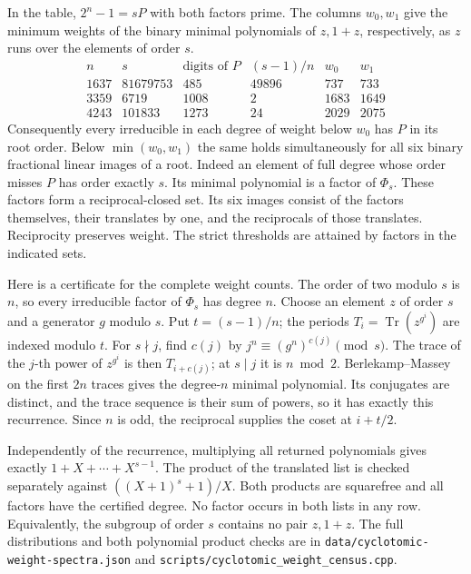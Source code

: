 \documentclass[11pt]{article}
\begin{document}
In the table, \(2^n-1=sP\) with both factors prime. The columns
\(w_0,w_1\) give the minimum weights of the binary minimal polynomials of
\(z,1+z\), respectively, as \(z\) runs over the elements of order \(s\).
\[
\begin{array}{r|r|r|r|r|r}
 n&s&\text{digits of }P&(s-1)/n&w_0&w_1\\\hline
 1637&81679753&485&49896&737&733\\
 3359&6719&1008&2&1683&1649\\
 4243&101833&1273&24&2029&2075
\end{array}
\]
Consequently every irreducible in each degree of weight below \(w_0\)
has \(P\) in its root order. Below \(\min(w_0,w_1)\) the same holds
simultaneously for all six binary fractional linear images of a root.
Indeed an element of full degree whose order misses \(P\) has order
exactly \(s\). Its minimal polynomial is a factor of \(\Phi_s\).
These factors form a reciprocal-closed set. Its six images consist of
the factors themselves, their translates by one, and the reciprocals
of those translates. Reciprocity preserves weight. The strict
thresholds are attained by factors in the indicated sets.

Here is a certificate for the complete weight counts. The order of two
modulo \(s\) is \(n\), so every irreducible factor of \(\Phi_s\) has
degree \(n\). Choose an element \(z\) of order \(s\) and a generator
\(g\) modulo \(s\). Put \(t=(s-1)/n\); the periods
\(T_i=\operatorname{Tr}(z^{g^i})\) are indexed modulo \(t\).
For \(s\nmid j\), find \(c(j)\) by
\(j^n\equiv(g^n)^{c(j)}\pmod s\). The trace of the \(j\)-th power
of \(z^{g^i}\) is then \(T_{i+c(j)}\); at \(s\mid j\) it is
\(n\bmod 2\). Berlekamp--Massey on the first \(2n\) traces gives
the degree-\(n\) minimal polynomial. Its conjugates are distinct,
and the trace sequence is their sum of powers, so it has exactly
this recurrence. Since \(n\) is odd, the reciprocal supplies the
coset at \(i+t/2\).

Independently of the recurrence, multiplying all returned polynomials
gives exactly \(1+X+\cdots+X^{s-1}\). The product of the translated
list is checked separately against \(((X+1)^s+1)/X\). Both products
are squarefree and all factors have the certified degree. No factor
occurs in both lists in any row. Equivalently, the subgroup of order
\(s\) contains no pair \(z,1+z\). The full distributions and both
polynomial product checks are in
\nolinkurl{data/cyclotomic-weight-spectra.json} and
\nolinkurl{scripts/cyclotomic_weight_census.cpp}.
\end{document}
